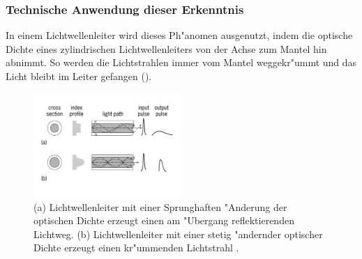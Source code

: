 \subsubsection{Technische Anwendung dieser Erkenntnis}
In einem Lichtwellenleiter wird dieses Ph"anomen ausgenutzt, 
indem  die  optische  Dichte  eines  zylindrischen
Lichtwellenleiters  von  der Achse zum Mantel hin abnimmt.
So werden die Lichtstrahlen immer vom Mantel weggekr"ummt 
und das Licht  bleibt im Leiter gefangen ().
\begin{figure}
\begin{center}
\includegraphics[width=0.5\textwidth]{licht/picture/Lichtwellenleiter.pdf}
	\caption{(a) Lichtwellenleiter mit einer Sprunghaften "Anderung der optischen Dichte erzeugt einen am "Ubergang reflektierenden Lichtweg. 
	(b) Lichtwellenleiter mit einer stetig "andernder optischer Dichte erzeugt einen kr"ummenden Lichtstrahl \cite{opticFibre}. }
	\label{lichtleiter}
\end{center}	
\end{figure}
